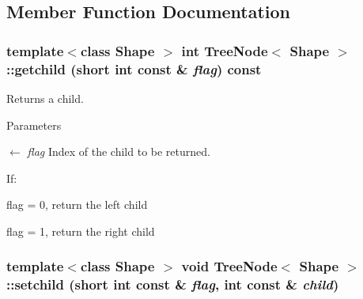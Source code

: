 \subsection{Member Function Documentation}
\hypertarget{classTreeNode_ae48bc7d93db5bbbfb8950cf309e17cb3}{
\subsubsection[{getchild}]{\setlength{\rightskip}{0pt plus 5cm}template$<$class Shape $>$ int {\bf TreeNode}$<$ Shape $>$::getchild (short int const \& {\em flag}) const}}
\label{classTreeNode_ae48bc7d93db5bbbfb8950cf309e17cb3}


Returns a child. 
\begin{DoxyParams}{Parameters}
\item[\mbox{$\leftarrow$} {\em flag}]Index of the child to be returned. \par
 If: 
\begin{DoxyItemize}
\item flag = 0, return the left child 
\item flag = 1, return the right child 
\end{DoxyItemize}\end{DoxyParams}
\hypertarget{classTreeNode_a5dc66c89b3e2a3a46600f08f0dad5b80}{
\subsubsection[{setchild}]{\setlength{\rightskip}{0pt plus 5cm}template$<$class Shape $>$ void {\bf TreeNode}$<$ Shape $>$::setchild (short int const \& {\em flag}, \/  int const \& {\em child})}}
\label{classTreeNode_a5dc66c89b3e2a3a46600f08f0dad5b80}


